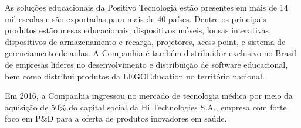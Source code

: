 As soluções educacionais da Positivo Tecnologia estão presentes em mais de 14 mil escolas e são exportadas para mais de 40 países. Dentre os principais produtos estão mesas educacionais, dispositivos móveis, lousas interativas, dispositivos de armazenamento e recarga, projetores, acess point, e sistema de gerenciamento de aulas. A Companhia é também distribuidor exclusivo no Brasil de empresas líderes no desenvolvimento e distribuição de software educacional, bem como distribui produtos da LEGO\texttrademark Education no território nacional.

Em 2016, a Companhia ingressou no mercado de tecnologia médica por meio da aquisição de 50\% do capital social da Hi Technologies S.A., empresa com forte foco em P\&D para a oferta de produtos inovadores em saúde.
